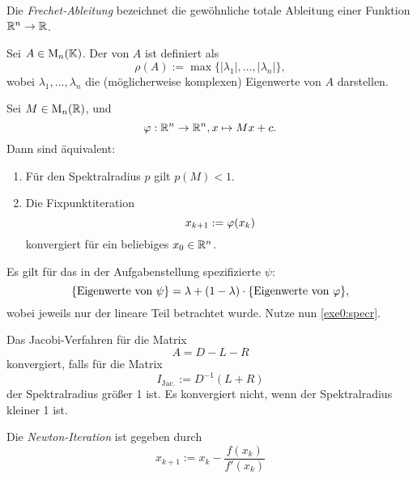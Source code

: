 \begin{defn}
	Die \emph{Frechet-Ableitung} bezeichnet die gewöhnliche totale Ableitung einer Funktion $\mathbb{R}^n\to \mathbb{R}$.
\end{defn}
\begin{defn}
Sei $A\in \operatorname{M}_n(\mathbb{K})$. Der  von $A$ ist definiert als
\[
\rho(A):= \max \{|\lambda_1|,...,|\lambda_n|\},
\]
wobei $\lambda_1,...,\lambda_n$ die (möglicherweise komplexen) Eigenwerte von $A$ darstellen.
\end{defn}
\begin{prop}\label{exe0:specr}
  Sei $M\in \operatorname{M}_n(\mathbb{R})$, und
  \[
    \varphi:\mathbb{R}^n\to \mathbb{R}^n,x\mapsto Mx+c.
  \]
  Dann sind äquivalent:
  \begin{enumerate}
    \item Für den Spektralradius $p$ gilt $p(M)<1.$
    \item Die Fixpunktiteration
    \[
    x_{k+1}:= \varphi(x_k)\]
    konvergiert für ein beliebiges $x_0\in \mathbb{R}^n$.
  \end{enumerate}
\end{prop}
\setcounter{sol}{1}
\begin{sol}
  Es gilt für das in der Aufgabenstellung spezifizierte $\psi$:
  \[
  \{\text{Eigenwerte von }\psi\} = \lambda + (1-\lambda)\cdot\{\text{Eigenwerte von }\varphi\},
  \]wobei jeweils nur der lineare Teil betrachtet wurde. Nutze nun \cref{exe0:specr}.
\end{sol}
\begin{prop}
  Das Jacobi-Verfahren für die Matrix
  \[
  A=D-L-R
  \]
  konvergiert, falls für die Matrix
  \[
  I_{\text{Jac}.}:= D^{-1}(L+R)
  \]
  der Spektralradius größer 1 ist. Es konvergiert nicht, wenn der Spektralradius kleiner 1 ist.
\end{prop}
\begin{defn}
  Die \emph{Newton-Iteration} ist gegeben durch
  \[
  x_{k+1}:= x_k - \frac{f(x_k)}{f'(x_k)}
  \]
\end{defn}
